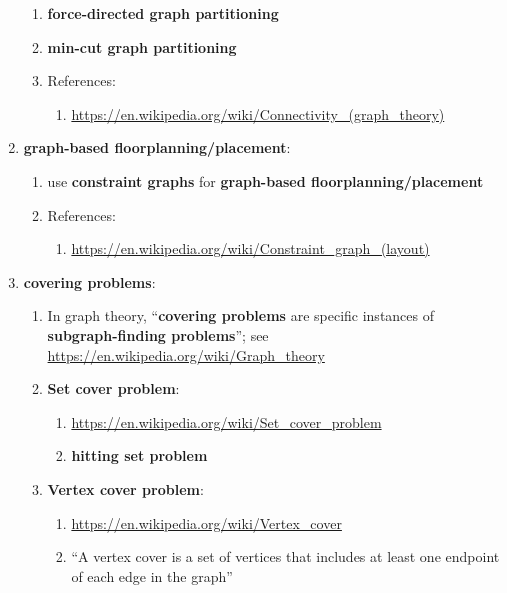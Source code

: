 \begin{enumerate}
	\begin{enumerate} \itemsep -2pt
	\item {\bf force-directed graph partitioning}
	\item {\bf min-cut graph partitioning}
	\item References: \vspace{-0.2cm}
		\begin{enumerate} \itemsep -2pt
		\item \url{https://en.wikipedia.org/wiki/Connectivity_(graph_theory)}
		\end{enumerate}
	\end{enumerate}
\item {\bf graph-based floorplanning/placement}: \vspace{-0.3cm}
	\begin{enumerate} \itemsep -2pt
	\item use {\bf constraint graphs} for {\bf graph-based floorplanning/placement}
	\item References: \vspace{-0.2cm}
		\begin{enumerate} \itemsep -2pt
		\item \url{https://en.wikipedia.org/wiki/Constraint_graph_(layout)}
		\end{enumerate}
	\end{enumerate}
\item {\bf covering problems}: %
	\begin{enumerate} %
	\item In graph theory, ``{\bf covering problems} are specific instances of {\bf subgraph-finding problems}''; see \url{https://en.wikipedia.org/wiki/Graph_theory}
	\item {\bf Set cover problem}: \vspace{-0.2cm}
		\begin{enumerate} \itemsep -2pt
		\item \url{https://en.wikipedia.org/wiki/Set_cover_problem}
		\item {\bf hitting set problem}
		\end{enumerate}
	\item {\bf Vertex cover problem}: \vspace{-0.2cm}
		\begin{enumerate} \itemsep -2pt
		\item \url{https://en.wikipedia.org/wiki/Vertex_cover}
		\item ``A vertex cover is a set of vertices that includes at least one endpoint of each edge in the graph'' \cite{WikipediaContributors2017a11}

\end{enumerate}
\end{enumerate}
\end{enumerate}
